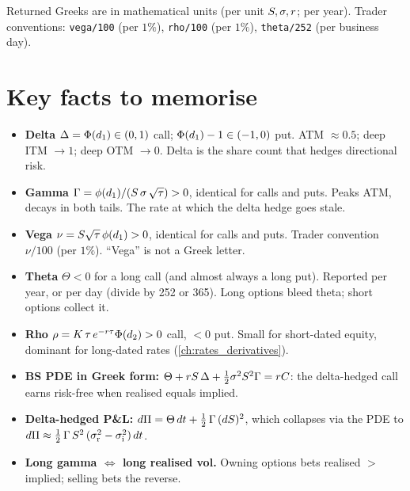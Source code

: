 \noindent Returned Greeks are in mathematical units (per unit
$S, \sigma, r$; per year). Trader conventions:
\texttt{vega/100} (per $1\%$), \texttt{rho/100} (per $1\%$),
\texttt{theta/252} (per business day).

\section{Key facts to memorise}
\label{sec:ch16_key_facts}

\begin{itemize}
  \item \textbf{Delta} $\Delta = \Phi(d_1) \in (0,1)$ call;
  $\Phi(d_1) - 1 \in (-1, 0)$ put. ATM $\approx 0.5$; deep ITM
  $\to 1$; deep OTM $\to 0$. Delta is the share count that hedges
  directional risk.

  \item \textbf{Gamma} $\Gamma = \phi(d_1)/(S\,\sigma\,\sqrt\tau)
  > 0$, identical for calls and puts. Peaks ATM, decays in both
  tails. The rate at which the delta hedge goes stale.

  \item \textbf{Vega} $\nu = S\sqrt\tau\,\phi(d_1) > 0$,
  identical for calls and puts. Trader convention $\nu/100$ (per
  $1\%$). ``Vega'' is not a Greek letter.

  \item \textbf{Theta} $\Theta < 0$ for a long call (and almost
  always a long put). Reported per year, or per day (divide by 252
  or 365). Long options bleed theta; short options collect it.

  \item \textbf{Rho} $\rho = K\,\tau\,e^{-r \tau}\Phi(d_2)
  > 0$ call, $< 0$ put. Small for short-dated equity, dominant for
  long-dated rates (\cref{ch:rates_derivatives}).

  \item \textbf{BS PDE in Greek form:}
  $\Theta + r S\,\Delta + \tfrac12 \sigma^2 S^2 \Gamma =
  r C$: the delta-hedged call earns risk-free when
  realised equals implied.

  \item \textbf{Delta-hedged P\&L:}
  $d\Pi = \Theta\,dt + \tfrac12\,\Gamma\,(dS)^2$, which
  collapses via the PDE to $d\Pi \approx \tfrac12\,\Gamma\,S^2\,
  (\sigma_{\text{r}}^2 - \sigma_{\text{i}}^2)\,dt$.

  \item \textbf{Long gamma $\Leftrightarrow$ long realised vol.}
  Owning options bets realised $>$ implied; selling bets the
  reverse.


\end{itemize}
